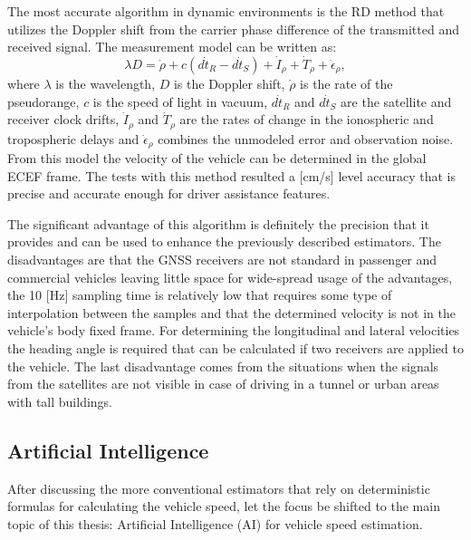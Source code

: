 The most accurate algorithm in dynamic environments is the RD method that utilizes the Doppler shift from the carrier phase difference of the transmitted and received signal. The measurement model can be written as:
\begin{equation}
    \lambda D = \dot \rho + c(d \dot t_R - d \dot t_S) + \dot I_{\rho} + \dot T_{\rho} + \dot \epsilon_{\rho},
\end{equation}
where $\lambda$ is the wavelength, $D$ is the Doppler shift, $\dot\rho$ is the rate of the pseudorange, $c$ is the speed of light in vacuum, $d\dot t_R$ and $d\dot t_S$ are the satellite and receiver clock drifts, $\dot I_{\rho}$ and $\dot T_{\rho}$ are the rates of change in the ionospheric and tropospheric delays and $\dot \epsilon_{\rho}$ combines the unmodeled error and observation noise. From this model the velocity of the vehicle can be determined in the global ECEF frame. The tests with this method resulted a [cm/s] level accuracy that is precise and accurate enough for driver assistance features. 

The significant advantage of this algorithm is definitely the precision that it provides and can be used to enhance the previously described estimators. The disadvantages are that the GNSS receivers are not standard in passenger and commercial vehicles leaving little space for wide-spread usage of the advantages, the 10 [Hz] sampling time is relatively low that requires some type of interpolation between the samples and that the determined velocity is not in the vehicle's body fixed frame. For determining the longitudinal and lateral velocities the heading angle is required that can be calculated if two receivers are applied to the vehicle. The last disadvantage comes from the situations when the signals from the satellites are not visible in case of driving in a tunnel or urban areas with tall buildings. 


\subsection{Artificial Intelligence}
After discussing the more conventional estimators that rely on deterministic formulas for calculating the vehicle speed, let the focus be shifted to the main topic of this thesis: Artificial Intelligence (AI) for vehicle speed estimation. 

